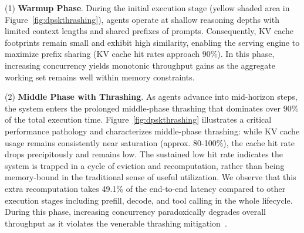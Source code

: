 (1) \noindent\textbf{Warmup Phase}. During the initial execution stage (yellow shaded area in Figure~\ref{fig:dpskthrashing}), agents operate at shallow reasoning depths with limited context lengths and shared prefixes of prompts. 
Consequently, KV cache footprints remain small and exhibit high similarity, enabling the serving engine to maximize prefix sharing (KV cache hit rates approach 90\%). In this phase, increasing concurrency yields monotonic throughput gains as the aggregate working set remains well within memory constraints.

(2) \noindent\textbf{Middle Phase with Thrashing}. 
As agents advance into mid-horizon steps, the system enters the prolonged middle-phase thrashing that dominates over 90\% of the total execution time. 
Figure~\ref{fig:dpskthrashing} illustrates a critical performance pathology and characterizes middle-phase thrashing: while KV cache usage remains consistently near saturation (approx. 80-100\%), the cache hit rate drops precipitously and remains low. The sustained low hit rate indicates the system is trapped in a cycle of eviction and recomputation, rather than being memory-bound in the traditional sense of useful utilization. We observe that this extra recomputation takes 49.1\% of the end-to-end latency compared to other execution stages including prefill, decode, and tool calling in the whole lifecycle. During this phase, increasing concurrency paradoxically degrades overall throughput as it violates the venerable thrashing mitigation~\cite{workingsetmodel}. 




